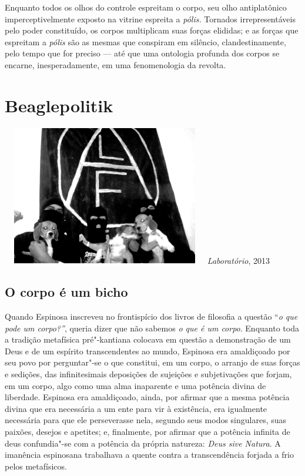 Enquanto todos os olhos do controle espreitam o corpo, seu olho
antiplatônico imperceptivelmente exposto na vitrine espreita a
\emph{pólis. }Tornados irrepresentáveis pelo poder constituído, os
corpos multiplicam suas forças elididas; e as forças que espreitam a
\emph{pólis} são as mesmas que conspiram em silêncio, clandestinamente,
pelo tempo que for preciso --- até que uma ontologia profunda dos corpos
se encarne, inesperadamente, em uma fenomenologia da revolta.

\chapter{Beaglepolitik}

\begin{center}
\includegraphics[width=9cm,height=6.1cm]{Imgs/img8.jpg}
\emph{Laboratório}, 2013
\end{center}

\section{O corpo é um bicho}

\textbf{}Quando Espinosa inscreveu no frontispício dos livros de
filosofia a questão ``\emph{o que pode um corpo?''}, queria dizer que
não sabemos \emph{o que é um corpo}. Enquanto toda a tradição metafísica
pré"-kantiana colocava em questão a demonstração de um Deus e de um
espírito transcendentes ao mundo, Espinosa era amaldiçoado por seu povo
por perguntar"-se o que constitui, em um corpo, o arranjo de suas forças
e sedições, das infinitesimais deposições de sujeições e subjetivações
que forjam, em um corpo, algo como uma alma inaparente e uma potência
divina de liberdade. Espinosa era amaldiçoado, ainda, por afirmar que a
mesma potência divina que era necessária a um ente para vir à
existência, era igualmente necessária para que ele perseverasse nela,
segundo seus modos singulares, suas paixões, desejos e apetites; e,
finalmente, por afirmar que a potência infinita de deus confundia"-se com
a potência da própria natureza: \emph{Deus sive Natura}. A imanência
espinosana trabalhava a quente contra a transcendência forjada a frio
pelos metafísicos.

